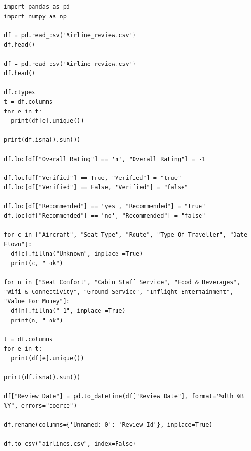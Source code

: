 \documentclass{Configuration_Files/PoliMi3i_thesis}
\begin{document}
\begin{verbatim}
import pandas as pd
import numpy as np

df = pd.read_csv('Airline_review.csv')
df.head()

df = pd.read_csv('Airline_review.csv')
df.head()

df.dtypes
t = df.columns
for e in t:
  print(df[e].unique())

print(df.isna().sum())

df.loc[df["Overall_Rating"] == 'n', "Overall_Rating"] = -1

df.loc[df["Verified"] == True, "Verified"] = "true"
df.loc[df["Verified"] == False, "Verified"] = "false"

df.loc[df["Recommended"] == 'yes', "Recommended"] = "true"
df.loc[df["Recommended"] == 'no', "Recommended"] = "false"

for c in ["Aircraft", "Seat Type", "Route", "Type Of Traveller", "Date Flown"]:
  df[c].fillna("Unknown", inplace =True)
  print(c, " ok")

for n in ["Seat Comfort", "Cabin Staff Service", "Food & Beverages", 
"Wifi & Connectivity", "Ground Service", "Inflight Entertainment", "Value For Money"]:
  df[n].fillna("-1", inplace =True)
  print(n, " ok")

t = df.columns
for e in t:
  print(df[e].unique()) 
  
print(df.isna().sum())

df["Review Date"] = pd.to_datetime(df["Review Date"], format="%dth %B %Y", errors="coerce")

df.rename(columns={'Unnamed: 0': 'Review Id'}, inplace=True)

df.to_csv("airlines.csv", index=False)
\end{verbatim}
\end{document}

